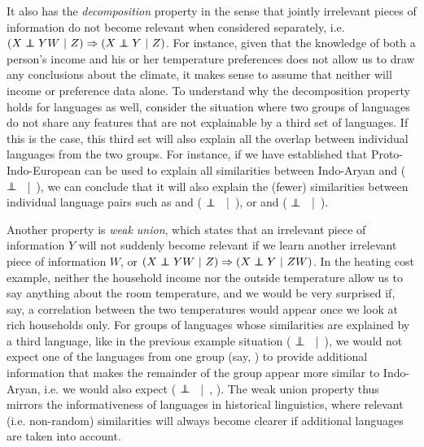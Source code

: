 It also has the \textit{decomposition} property in the sense that jointly irrelevant pieces of information do not become relevant when considered separately, i.e.\ $(X \independent YW\ |\ Z) \Rightarrow (X \independent Y\ |\ Z)$. For instance, given that the knowledge of both a person's income and his or her temperature preferences does not allow us to draw any conclusions about the climate, it makes sense to assume that neither will income or preference data alone. To understand why the decomposition property holds for languages as well, consider the situation where two groups of languages do not share any features that are not explainable by a third set of languages. If this is the case, this third set will also explain all the overlap between individual languages from the two groups. For instance, if we have established that Proto-Indo-European can be used to explain all similarities between Indo-Aryan and  ( $\independent$ \ |\ ), we can conclude that it will also explain the (fewer) similarities between individual language pairs such as  and  ( $\independent$ \ |\ ), or  and  ( $\independent$ \ |\ ).

Another property is \textit{weak union}, which states that an irrelevant piece of information $Y$ will not suddenly become relevant if we learn another irrelevant piece of information $W$, or $(X \independent YW\ |\ Z) \Rightarrow (X \independent Y\ |\ ZW)$. In the heating cost example, neither the household income nor the outside temperature allow us to say anything about the room temperature, and we would be very surprised if, say, a correlation between the two temperatures would appear once we look at rich households only. For groups of languages whose similarities are explained by a third language, like in the previous example situation ( $\independent$ \ |\ ), we would not expect one of the languages from one group (say, ) to provide additional information that makes the remainder of the group appear more similar to Indo-Aryan, i.e. we would also expect ( $\independent$ \ |\ , ). The weak union property thus mirrors the informativeness of languages in historical linguistics, where relevant (i.e. non-random) similarities will always become clearer if additional languages are taken into account.

